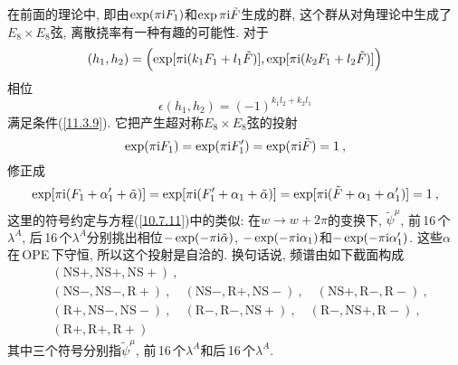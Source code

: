 在前面的理论中, 即由$ \exp(\pi\mathrm{i} F_{1}) $和$ \exp{\pi\mathrm{i}\tilde{F}} $生成的群, 这个群从对角理论中生成了$ E_{8}\times E_{8}$弦, 离散挠率有一种有趣的可能性. 对于
\begin{equation}
   (h_{1},h_{2})= \Bigl(\exp[\pi\mathrm{i}(k_{1}F_{1}+l_{1}\tilde{F})],
   \exp[\pi\mathrm{i}(k_{2}F_{1}+l_{2}\tilde{F})]\Bigr) \label{11.3.12} 
\end{equation}
相位
\begin{equation}
    \epsilon(h_{1},h_{2})= (-1)^{k_{1}l_{2}+k_{2}l_{1}} \label{11.3.13}
\end{equation}
满足条件(\ref{11.3.9}). 它把产生超对称$ E_{8}\times E_{8} $弦的投射
\begin{equation}
    \exp(\pi\mathrm{i} F_{1})=\exp(\pi\mathrm{i} F_{1}^{\prime}) = \exp(\pi\mathrm{i}\tilde{F})=1\:, \label{11.3.14}
\end{equation}
修正成
\begin{equation}
    \exp[\pi\mathrm{i} (F_{1}+\alpha_{1}^{\prime}+\tilde{\alpha})]
    =\exp[\pi\mathrm{i}(F_{1}^{\prime}+\alpha_{1}+\tilde{\alpha})] 
    = \exp[\pi\mathrm{i}(\tilde{F}+\alpha_{1}+\alpha_{1}^{\prime})]=1\:, \label{11.3.15}
\end{equation}
这里的符号约定与方程(\ref{10.7.11})中的类似: 在$ w\to w+2\pi $的变换下, $\tilde{\psi}^{\mu}$, 前\,16\,个$ \lambda^{A}$, 后\,16\,个$ \lambda^{A} $分别挑出相位$ -\exp(-\pi\mathrm{i}\tilde{\alpha})$, $-\exp(-\pi\mathrm{i}\alpha_{1}) $和$ -\exp(-\pi\mathrm{i}\alpha_{1}^{\prime})$. 这些$ \alpha $在\,OPE\,下守恒, 所以这个投射是自洽的. 换句话说, 频谱由如下截面构成
\begin{align*}
    &(\mathrm{NS}+,\mathrm{NS}+,\mathrm{NS}+) \:, \\
    &(\mathrm{NS}-,\mathrm{NS}-,\mathrm{R}+)\:,\quad (\mathrm{NS}-,\mathrm{R}+,\mathrm{NS}-)\:,\quad
    (\mathrm{NS}+,\mathrm{R}-,\mathrm{R}-)\:, \\
    &(\mathrm{R}+,\mathrm{NS}-,\mathrm{NS}-)\:,\quad (\mathrm{R}-,\mathrm{R}-,\mathrm{NS}+)\:, \quad
    (\mathrm{R}-,\mathrm{NS}+,\mathrm{R}-) \:, \\
    &(\mathrm{R}+,\mathrm{R}+,\mathrm{R}+) 
\end{align*}
其中三个符号分别指$ \tilde{\psi}^{\mu}$, 前\,16\,个$ \lambda^{A} $和后\,16\,个$ \lambda^{A}$.

